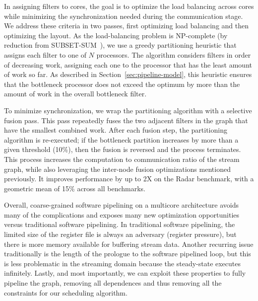 In assigning filters to cores, the goal is to optimize the load
balancing across cores while minimizing the synchronization needed
during the communication stage.  We address these criteria in two
passes, first optimizing load balancing and then optimizing the
layout.  As the load-balancing problem is NP-complete (by reduction
from SUBSET-SUM~\cite{sipser97}), we use a greedy partitioning
heuristic that assigns each filter to one of $N$ processors.  The
algorithm considers filters in order of decreasing work, assigning
each one to the processor that has the least amount of work so far.
As described in Section~\ref{sec:pipeline-model}, this heuristic
ensures that the bottleneck processor does not exceed the optimum by
more than the amount of work in the overall bottleneck filter.

To minimize synchronization, we wrap the partitioning algorithm with a
selective fusion pass.  This pass repeatedly fuses the two adjacent
filters in the graph that have the smallest combined work.  After each
fusion step, the partitioning algorithm is re-executed; if the
bottleneck partition increases by more than a given threshold (10\%),
then the fusion is reversed and the process terminates.  This process
increases the computation to communication ratio of the stream graph,
while also leveraging the inter-node fusion optimizations mentioned
previously.  It improves performance by up to 2X on the Radar
benchmark, with a geometric mean of 15\% across all benchmarks.

Overall, coarse-grained software pipelining on a multicore
architecture avoids many of the complications and exposes many new
optimization opportunities versus traditional software pipelining.  In
traditional software pipelining, the limited size of the register file
is always an adversary (register pressure), but there is more memory
available for buffering stream data.
Another recurring issue traditionally is the length of the prologue to
the software pipelined loop, but this is less problematic in the
streaming domain because the steady-state executes infinitely.
Lastly, and most importantly, we can exploit these properties to fully
pipeline the graph, removing all dependences and thus removing all the
constraints for our scheduling algorithm.



